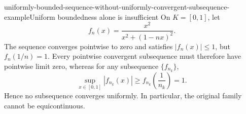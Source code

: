 \documentclass[preview]{standalone}
\begin{document}
\begin{snippetexample}{uniformly-bounded-sequence-without-uniformly-convergent-subsequence-example}{Uniform boundedness alone is insufficient}
    On \(K=[0,1]\), let
    \[
        f_n(x)=\frac{x^2}{x^2+(1-nx)^2}.
    \]
    The sequence converges pointwise to zero and satisfies
    \(|f_n(x)|\leq1\), but \(f_n(1/n)=1\). Every pointwise convergent
    subsequence must therefore have pointwise limit zero, whereas for any
    subsequence \(\{f_{n_k}\}\),
    \[
        \sup_{x\in[0,1]}|f_{n_k}(x)|
        \geq f_{n_k}\left(\frac1{n_k}\right)=1.
    \]
    Hence no subsequence converges uniformly. In particular, the original
    family cannot be equicontinuous.
\end{snippetexample}
\end{document}
